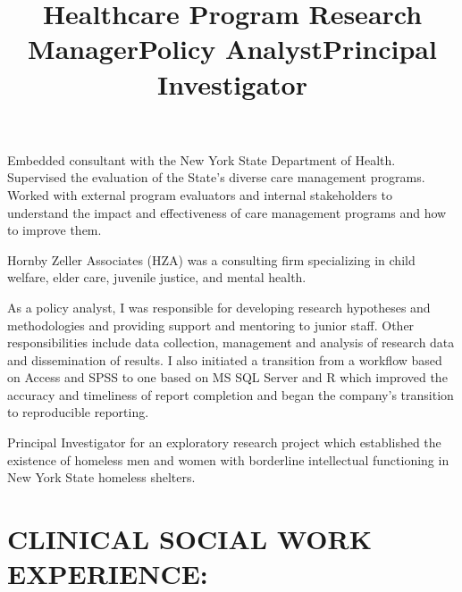 \documentclass[line, mm, 10pt]{res}
\begin{document}
\begin{resume}
  \title{Healthcare Program Research Manager}
  \begin{position}
    Embedded consultant with the New York State Department of Health. Supervised
    the evaluation of the State's diverse care management programs. Worked with
    external program evaluators and internal stakeholders to understand the
    impact and effectiveness of care management programs and how to improve
    them.

    \end{position}

  \title{Policy Analyst}
  \begin{position}
    Hornby Zeller Associates (HZA) was a consulting firm specializing in child
    welfare, elder care, juvenile justice, and mental health. 
    
    As a policy analyst, I was responsible for developing research hypotheses
    and methodologies and providing support and mentoring to junior staff. Other
    responsibilities include data collection, management and analysis of
    research data and dissemination of results. I also initiated a transition
    from a workflow based on Access and SPSS to one based on MS SQL Server and R
    which improved the accuracy and timeliness of report completion and began
    the company's transition to reproducible reporting.
  \end{position}

  \title{Principal Investigator}
  \begin{position}
    Principal Investigator for an exploratory research project which
    established the existence of homeless men and women with
    borderline intellectual functioning in New York State homeless
    shelters.
  \end{position}


  \section{CLINICAL SOCIAL WORK EXPERIENCE:}


\end{resume}
\end{document}
